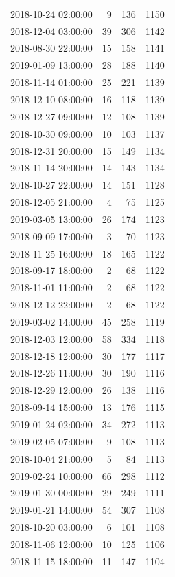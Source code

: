 \begin{tabular}{lrrr}
2018-10-24 02:00:00 & 9 & 136 & 1150 \\
2018-12-04 03:00:00 & 39 & 306 & 1142 \\
2018-08-30 22:00:00 & 15 & 158 & 1141 \\
2019-01-09 13:00:00 & 28 & 188 & 1140 \\
2018-11-14 01:00:00 & 25 & 221 & 1139 \\
2018-12-10 08:00:00 & 16 & 118 & 1139 \\
2018-12-27 09:00:00 & 12 & 108 & 1139 \\
2018-10-30 09:00:00 & 10 & 103 & 1137 \\
2018-12-31 20:00:00 & 15 & 149 & 1134 \\
2018-11-14 20:00:00 & 14 & 143 & 1134 \\
2018-10-27 22:00:00 & 14 & 151 & 1128 \\
2018-12-05 21:00:00 & 4 & 75 & 1125 \\
2019-03-05 13:00:00 & 26 & 174 & 1123 \\
2018-09-09 17:00:00 & 3 & 70 & 1123 \\
2018-11-25 16:00:00 & 18 & 165 & 1122 \\
2018-09-17 18:00:00 & 2 & 68 & 1122 \\
2018-11-01 11:00:00 & 2 & 68 & 1122 \\
2018-12-12 22:00:00 & 2 & 68 & 1122 \\
2019-03-02 14:00:00 & 45 & 258 & 1119 \\
2018-12-03 12:00:00 & 58 & 334 & 1118 \\
2018-12-18 12:00:00 & 30 & 177 & 1117 \\
2018-12-26 11:00:00 & 30 & 190 & 1116 \\
2018-12-29 12:00:00 & 26 & 138 & 1116 \\
2018-09-14 15:00:00 & 13 & 176 & 1115 \\
2019-01-24 02:00:00 & 34 & 272 & 1113 \\
2019-02-05 07:00:00 & 9 & 108 & 1113 \\
2018-10-04 21:00:00 & 5 & 84 & 1113 \\
2019-02-24 10:00:00 & 66 & 298 & 1112 \\
2019-01-30 00:00:00 & 29 & 249 & 1111 \\
2019-01-21 14:00:00 & 54 & 307 & 1108 \\
2018-10-20 03:00:00 & 6 & 101 & 1108 \\
2018-11-06 12:00:00 & 10 & 125 & 1106 \\
2018-11-15 18:00:00 & 11 & 147 & 1104 \\

\end{tabular}

